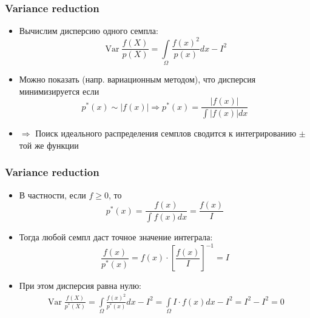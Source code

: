 \documentclass[10pt]{beamer}
\begin{document}
\begin{frame}
\frametitle{Variance reduction}
\begin{itemize}
\item Вычислим дисперсию одного семпла:
\begin{equation*}
\operatorname{Var}\frac{f(X)}{p(X)} = \int\limits_\Omega \frac{f(x)^2}{p(x)}dx - I^2
\end{equation*}
\pause
\item Можно показать (напр. вариационным методом), что дисперсия минимизируется если
\begin{equation*}
p^*(x) \sim |f(x)| \Longrightarrow p^*(x) = \frac{|f(x)|}{\int |f(x)|dx}
\end{equation*}
\pause
\item \begin{math}\Longrightarrow\end{math} Поиск идеального распределения семплов сводится к интегрированию \begin{math}\pm\end{math} той же функции
\end{itemize}
\end{frame}

\begin{frame}
\frametitle{Variance reduction}
\begin{itemize}
\item В частности, если \begin{math}f\geq 0\end{math}, то 
\begin{equation*}
p^*(x) = \frac{f(x)}{\int f(x)dx} = \frac{f(x)}{I}
\end{equation*}
\pause
\item Тогда любой семпл даст точное значение интеграла:
\begin{equation*}
\frac{f(x)}{p^*(x)} = f(x) \cdot \left[\frac{f(x)}{I}\right]^{-1} = I
\end{equation*}
\pause
\item При этом дисперсия равна нулю:
\begin{gather*}
\operatorname{Var}\frac{f(X)}{p^*(X)} = \int\limits_\Omega \frac{f(x)^2}{p^*(x)}dx - I^2 = \int\limits_\Omega I\cdot f(x)dx - I^2 = I^2 - I^2 = 0
\end{gather*}
\end{itemize}
\end{frame}
\end{document}
